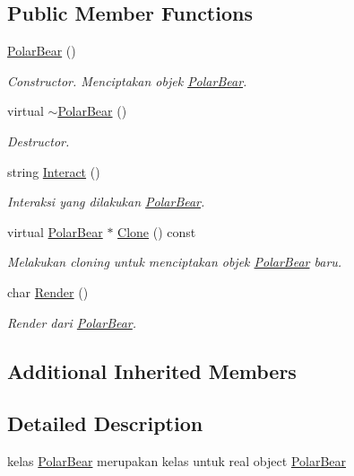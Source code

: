 \subsection*{Public Member Functions}
\begin{DoxyCompactItemize}
\item 
\hyperlink{classPolarBear_a646f53f9fa472dcc7873e6a912cbc474}{Polar\+Bear} ()
\begin{DoxyCompactList}\small\item\em Constructor. Menciptakan objek \hyperlink{classPolarBear}{Polar\+Bear}. \end{DoxyCompactList}\item 
virtual \hyperlink{classPolarBear_a84e510e1476910f33cbb0bbe2fff3566}{$\sim$\+Polar\+Bear} ()
\begin{DoxyCompactList}\small\item\em Destructor. \end{DoxyCompactList}\item 
string \hyperlink{classPolarBear_a2c266e69dd929ac3b10fe7484a77a5a4}{Interact} ()
\begin{DoxyCompactList}\small\item\em Interaksi yang dilakukan \hyperlink{classPolarBear}{Polar\+Bear}. \end{DoxyCompactList}\item 
virtual \hyperlink{classPolarBear}{Polar\+Bear} $\ast$ \hyperlink{classPolarBear_aad58cdb9b360996a94f12ade5b6743b7}{Clone} () const 
\begin{DoxyCompactList}\small\item\em Melakukan cloning untuk menciptakan objek \hyperlink{classPolarBear}{Polar\+Bear} baru. \end{DoxyCompactList}\item 
char \hyperlink{classPolarBear_a7feccf8999fb0ab000c052583ad0217a}{Render} ()
\begin{DoxyCompactList}\small\item\em Render dari \hyperlink{classPolarBear}{Polar\+Bear}. \end{DoxyCompactList}\end{DoxyCompactItemize}
\subsection*{Additional Inherited Members}


\subsection{Detailed Description}
kelas \hyperlink{classPolarBear}{Polar\+Bear} merupakan kelas untuk real object \hyperlink{classPolarBear}{Polar\+Bear} 

